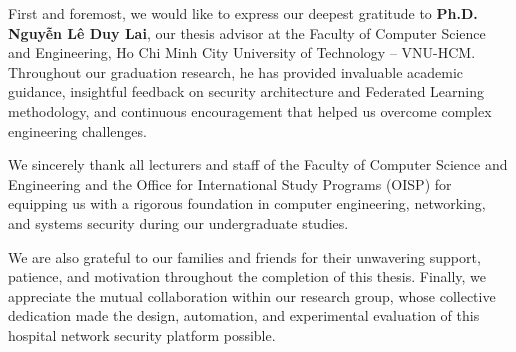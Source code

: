 
First and foremost, we would like to express our deepest gratitude to \textbf{Ph.D. Nguyễn Lê Duy Lai}, our thesis advisor at the Faculty of Computer Science and Engineering, Ho Chi Minh City University of Technology -- VNU-HCM. Throughout our graduation research, he has provided invaluable academic guidance, insightful feedback on security architecture and Federated Learning methodology, and continuous encouragement that helped us overcome complex engineering challenges.

We sincerely thank all lecturers and staff of the Faculty of Computer Science and Engineering and the Office for International Study Programs (OISP) for equipping us with a rigorous foundation in computer engineering, networking, and systems security during our undergraduate studies.

We are also grateful to our families and friends for their unwavering support, patience, and motivation throughout the completion of this thesis. Finally, we appreciate the mutual collaboration within our research group, whose collective dedication made the design, automation, and experimental evaluation of this hospital network security platform possible.
